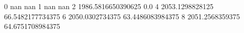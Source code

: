 0 nan nan
1 nan nan
2 1986.5816650390625 0.0
4 2053.1298828125 66.5482177734375
6 2050.0302734375 63.4486083984375
8 2051.2568359375 64.6751708984375
